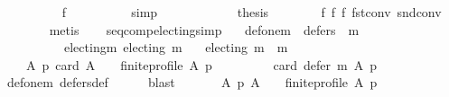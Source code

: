 \begin{isabellebody}
\ \ \ \ \ \ \ \ \isamarkupfalse%
\ f{}\isanewline
\ \ \ \ \ \ \ \ \isamarkupfalse%
\ simp\isanewline
\ \ \ \ \isacommand{{\isacharbraceright}{\kern0pt}}\isamarkupfalse%
\isanewline
\ \ \ \ \isamarkupfalse%
\ \isamarkupfalse%
\ {\isacharquery}{\kern0pt}thesis\isanewline
\ \ \ \ \ \ \isamarkupfalse%
\ f{}\ f{}\ f{}\ fst{\isacharunderscore}{\kern0pt}conv\ snd{\isacharunderscore}{\kern0pt}conv\isanewline
\ \ \ \ \ \ \isamarkupfalse%
\ metis\isanewline
\ \ \isamarkupfalse%
\isanewline
{}\isamarkupfalse%
%
\endisatagproof
{\isafoldproof}%
%
\isadelimproof
\isanewline
%
\endisadelimproof
\isanewline
\isanewline
{}\isamarkupfalse%
\ seq{\isacharunderscore}{\kern0pt}comp{\isacharunderscore}{\kern0pt}electing{\isacharbrackleft}{\kern0pt}simp{\isacharbrackright}{\kern0pt}{\isacharcolon}{\kern0pt}\isanewline
\ \ \ def{\isacharunderscore}{\kern0pt}one{\isacharunderscore}{\kern0pt}m{}{\isacharcolon}{\kern0pt}\ \ {\isachardoublequoteopen}defers\ {}\ m{}{\isachardoublequoteclose}\ \isanewline
\ \ \ \ \ \ \ \ \ \ electing{\isacharunderscore}{\kern0pt}m{}{\isacharcolon}{\kern0pt}\ {\isachardoublequoteopen}electing\ m{}{\isachardoublequoteclose}\isanewline
\ \ \ {\isachardoublequoteopen}electing\ {\isacharparenleft}{\kern0pt}m{}\ {\isasymtriangleright}\ m{}{\isacharparenright}{\kern0pt}{\isachardoublequoteclose}\isanewline
%
\isadelimproof
%
\endisadelimproof
%
\isatagproof
{}\isamarkupfalse%
\ {\isacharminus}{\kern0pt}\isanewline
\ \ \isamarkupfalse%
\isanewline
\ \ \ \ {\isachardoublequoteopen}{\isasymforall}A\ p{\isachardot}{\kern0pt}\ {\isacharparenleft}{\kern0pt}card\ A\ {\isasymge}\ {}\ {\isasymand}\ finite{\isacharunderscore}{\kern0pt}profile\ A\ p{\isacharparenright}{\kern0pt}\ {\isasymlongrightarrow}\isanewline
\ \ \ \ \ \ \ \ card\ {\isacharparenleft}{\kern0pt}defer\ m{}\ A\ p{\isacharparenright}{\kern0pt}\ {\isacharequal}{\kern0pt}\ {}{\isachardoublequoteclose}\isanewline
\ \ \ \ \isamarkupfalse%
\ def{\isacharunderscore}{\kern0pt}one{\isacharunderscore}{\kern0pt}m{}\ defers{\isacharunderscore}{\kern0pt}def\isanewline
\ \ \ \ \isamarkupfalse%
\ blast\isanewline
\ \ \isamarkupfalse%
\isanewline
\ \ \ \ {\isachardoublequoteopen}{\isasymforall}A\ p{\isachardot}{\kern0pt}\ {\isacharparenleft}{\kern0pt}A\ {\isasymnoteq}\ {\isacharbraceleft}{\kern0pt}{\isacharbraceright}{\kern0pt}\ {\isasymand}\ finite{\isacharunderscore}{\kern0pt}profile\ A\ p{\isacharparenright}{\kern0pt}\ {\isasymlongrightarrow}\isanewline

\end{isabellebody}
